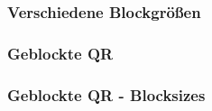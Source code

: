 \begin{frame}
	\frametitle{Verschiedene Blockgrößen}
		\centering
\end{frame}

\begin{frame}
	\frametitle{Geblockte QR}
		\frametitle{Geblockte QR - Blocksizes}
	\centering
\end{frame}




